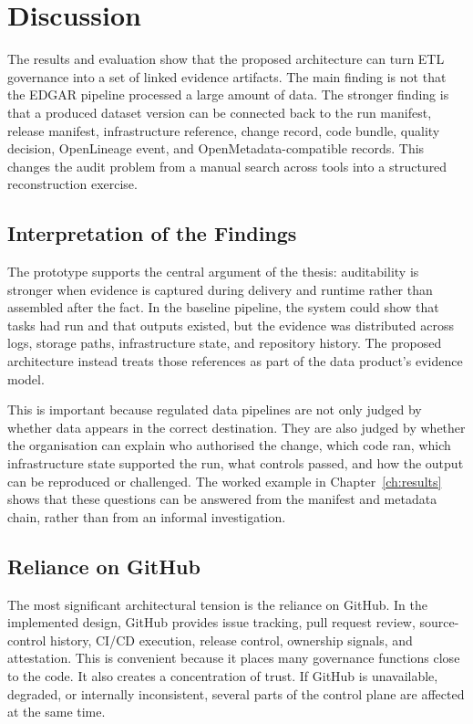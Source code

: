 \chapter{Discussion}
\noindent
The results and evaluation show that the proposed architecture can turn ETL
governance into a set of linked evidence artifacts. The main finding is not
that the EDGAR pipeline processed a large amount of data. The stronger finding
is that a produced dataset version can be connected back to the run manifest,
release manifest, infrastructure reference, change record, code bundle, quality
decision, OpenLineage event, and OpenMetadata-compatible records. This changes
the audit problem from a manual search across tools into a structured
reconstruction exercise.

\section{Interpretation of the Findings}
\noindent
The prototype supports the central argument of the thesis: auditability is
stronger when evidence is captured during delivery and runtime rather than
assembled after the fact. In the baseline pipeline, the system could show that
tasks had run and that outputs existed, but the evidence was distributed across
logs, storage paths, infrastructure state, and repository history. The proposed
architecture instead treats those references as part of the data product's
evidence model.

This is important because regulated data pipelines are not only judged by
whether data appears in the correct destination. They are also judged by
whether the organisation can explain who authorised the change, which code ran,
which infrastructure state supported the run, what controls passed, and how the
output can be reproduced or challenged. The worked example in
Chapter~\ref{ch:results} shows that these questions can be answered from the
manifest and metadata chain, rather than from an informal investigation.

\section{Reliance on GitHub}
\noindent
The most significant architectural tension is the reliance on GitHub. In the
implemented design, GitHub provides issue tracking, pull request review,
source-control history, CI/CD execution, release control, ownership signals,
and attestation. This is convenient because it places many governance
functions close to the code. It also creates a concentration of trust. If
GitHub is unavailable, degraded, or internally inconsistent, several parts of
the control plane are affected at the same time.

